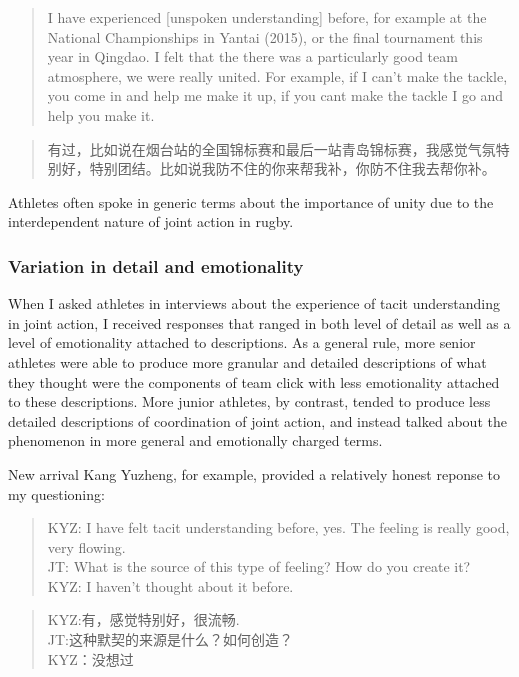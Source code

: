 \begin{CJK}{UTF8}{gbsn}
  \begin{quote}
    I have experienced [unspoken understanding] before, for example at the National Championships in Yantai (2015), or the final tournament this year in Qingdao.  I felt that the there was a particularly good team atmosphere, we were really united.  For example, if I can't make the tackle, you come in and help me make it up, if you cant make the tackle I go and help you make it.
  \end{quote}

  \begin{quote}
    有过，比如说在烟台站的全国锦标赛和最后一站青岛锦标赛，我感觉气氛特别好，特别团结。比如说我防不住的你来帮我补，你防不住我去帮你补。
  \end{quote}


Athletes often spoke in generic terms about the importance of unity due to the interdependent nature of joint action in rugby.







\subsubsection{Variation in detail and emotionality}
When I asked athletes in interviews about the experience of tacit understanding in joint action, I received responses that ranged in both level of detail as well as a level of emotionality attached to descriptions.  As a general rule, more senior athletes were able to produce more granular and detailed descriptions of what they thought were the components of team click with less emotionality attached to these descriptions.  More junior athletes, by contrast, tended to produce less detailed descriptions of coordination of joint action, and instead talked about the phenomenon in more general and emotionally charged terms.

New arrival Kang Yuzheng, for example, provided a relatively honest reponse to my questioning:

\begin{quote}
  KYZ: I have felt tacit understanding before, yes.  The feeling is really good, very flowing. \\
  JT: What is the source of this type of feeling? How do you create it? \\
  KYZ: I haven't thought about it before.
\end{quote}

\begin{quote}
  KYZ:有，感觉特别好，很流畅. \\
  JT:这种默契的来源是什么？如何创造？\\
  KYZ：没想过
\end{quote}



\end{CJK}
